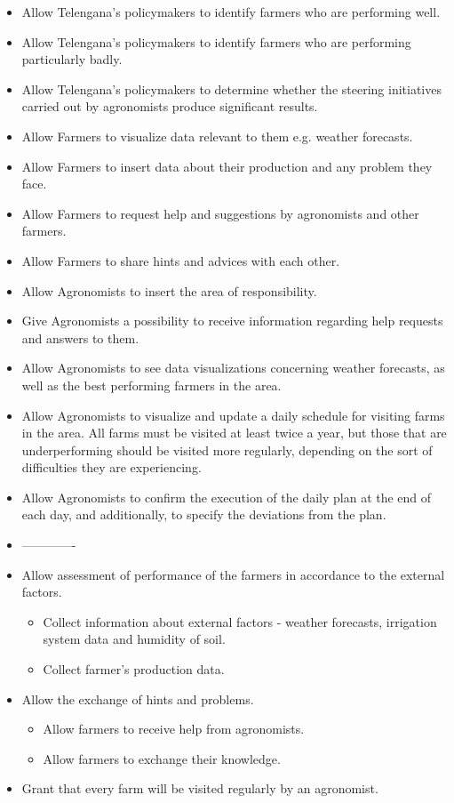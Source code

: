 \begin{itemize}
    \item Allow Telengana's policymakers to identify farmers who are performing well.
    \item Allow Telengana's policymakers to identify farmers who are performing particularly badly.
    \item Allow Telengana's policymakers to determine whether the steering initiatives carried out by agronomists produce significant results.
    \item Allow Farmers to visualize data relevant to them e.g. weather forecasts.
    \item Allow Farmers to insert data about their production and any problem they face.
    \item Allow Farmers to request help and suggestions by agronomists and other farmers.
    \item Allow Farmers to share hints and advices with each other.
    \item Allow Agronomists to insert the area of responsibility.
    \item Give Agronomists a possibility to receive information regarding help requests and answers to them.
    \item Allow Agronomists to see data visualizations concerning weather forecasts, as well as the best performing farmers in the area.
    \item Allow Agronomists to visualize and update a daily schedule for visiting farms in the area. All farms must be visited at least twice a year, but those that are underperforming should be visited more regularly, depending on the sort of difficulties they are experiencing.
    \item Allow Agronomists to confirm the execution of the daily plan at the end of each day, and additionally, to specify the deviations from the plan.
    
    \item -------------
    
    \item Allow assessment of performance of the farmers in accordance to the external factors.
    \begin{itemize}
        \item Collect information about external factors - weather forecasts, irrigation system data and humidity of soil.
        \item Collect farmer's production data.
    \end{itemize}
    \item Allow the exchange of hints and problems.
    \begin{itemize}
        \item Allow farmers to receive help from agronomists.
        \item Allow farmers to exchange their knowledge.
    \end{itemize}
    \item Grant that every farm will be visited regularly by an agronomist. 


\end{itemize}
